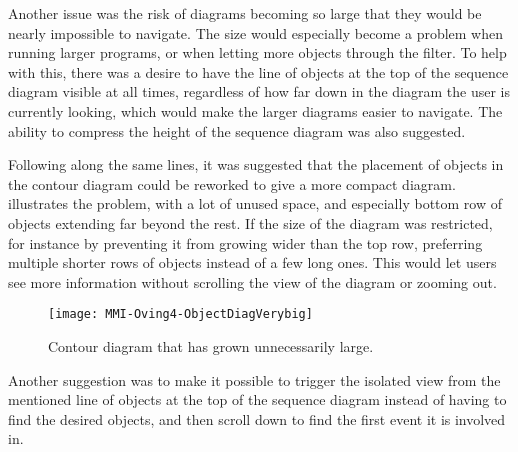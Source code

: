 Another issue was the risk of diagrams becoming so large that they would be nearly impossible to navigate.
The size would especially become a problem when running larger programs, or when letting more objects through the filter.
To help with this, there was a desire to have the line of objects at the top of the sequence diagram visible at all times, regardless of how far down in the diagram the user is currently looking, which would make the larger diagrams easier to navigate.
The ability to compress the height of the sequence diagram was also suggested.

Following along the same lines, it was suggested that the placement of objects in the contour diagram could be reworked to give a more compact diagram.
 illustrates the problem, with a lot of unused space, and especially bottom row of objects extending far beyond the rest.
If the size of the diagram was restricted, for instance by preventing it from growing wider than the top row, preferring multiple shorter rows of objects instead of a few long ones.
This would let users see more information without scrolling the view of the diagram or zooming out.

\begin{figure}[ht]
	\centering
	\texttt{[image: MMI-Oving4-ObjectDiagVerybig]}
	\caption{Contour diagram that has grown unnecessarily large.}
	\label{fig:MMI-Oving4-ObjectDiagVerybig}
\end{figure}

Another suggestion was to make it possible to trigger the isolated view from the mentioned line of objects at the top of the sequence diagram instead of having to find the desired objects, and then scroll down to find the first event it is involved in.
